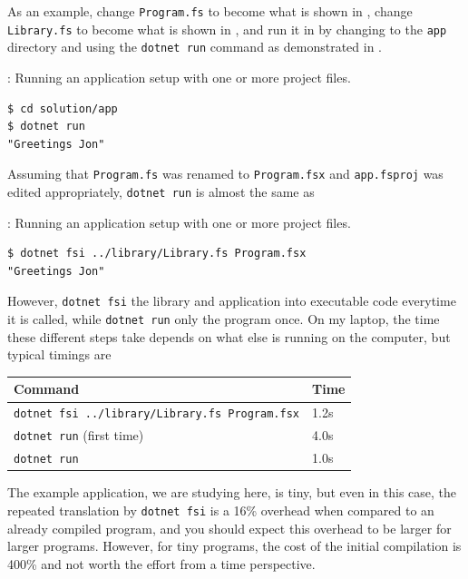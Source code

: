 \documentclass[fsharpNotes.tex]{subfiles}
\begin{document}
As an example, change \lstinline[language=console]{Program.fs} to become what is shown in ,
change \lstinline[language=console]{Library.fs} to become what is shown in , 
and run it in  by changing to the \lstinline[language=console]{app} directory and using the \lstinline[language=console]{dotnet run} command as demonstrated in .
\begin{codeNOutput}[label=dotnetRun,
  top=-5pt,
  bottom=-5pt,
  left=-2pt,
  right=-2pt,
]{: Running an application setup with one or more project files.}
  \begin{lstlisting}[language=console,escapechar=§]
$ cd solution/app
$ dotnet run
"Greetings Jon"
\end{lstlisting}%
\end{codeNOutput}
Assuming that \lstinline[language=console]{Program.fs} was renamed to \lstinline[language=console]{Program.fsx} and \lstinline[language=console]{app.fsproj} was edited appropriately, \lstinline[language=console]{dotnet run} is almost the same as
\begin{codeNOutput}[label=dotnetRun,
  top=-5pt,
  bottom=-5pt,
  left=-2pt,
  right=-2pt,
]{: Running an application setup with one or more project files.}
  \begin{lstlisting}[language=console,escapechar=§]
$ dotnet fsi ../library/Library.fs Program.fsx
"Greetings Jon"
\end{lstlisting}%
\end{codeNOutput}
However, \lstinline[language=console]{dotnet fsi}  the library and application into executable code everytime it is called, while \lstinline[language=console]{dotnet run} only  the program once. On my laptop, the time these different steps take depends on what else is running on the computer, but typical timings are
\begin{center}
  \begin{tabular}{|l|l|}
    \hline
    \rowcolor{headerRowColor} Command & Time\\
    \hline
    \lstinline[language=console]|dotnet fsi ../library/Library.fs Program.fsx| & 1.2s\\
    \lstinline[language=console]|dotnet run| (first time) & 4.0s\\
    \lstinline[language=console]|dotnet run| & 1.0s\\
    \hline
\end{tabular}
\end{center}
The example application, we are studying here, is tiny, but even in this case, the repeated translation by \lstinline[language=console]{dotnet fsi} is a 16\% overhead when compared to an already compiled program, and you should expect this overhead to be larger for larger programs. However, for tiny programs, the cost of the initial compilation is 400\% and not worth the effort from a time perspective.
\end{document}
